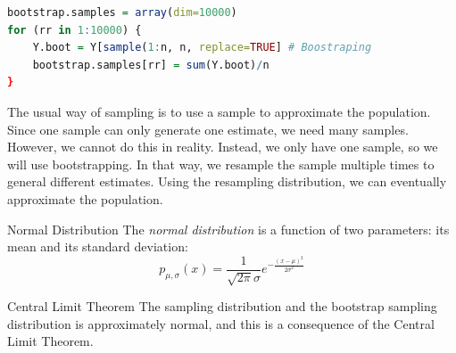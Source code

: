 \begin{lstlisting}[title=Boostraping Sample, language=r]
bootstrap.samples = array(dim=10000)
for (rr in 1:10000) {
	Y.boot = Y[sample(1:n, n, replace=TRUE] # Boostraping
	bootstrap.samples[rr] = sum(Y.boot)/n
}
\end{lstlisting}


\begin{rmk}
	The usual way of sampling is to use a sample to approximate the population. Since one sample can only generate one estimate, we need many samples. However, we cannot do this in reality. Instead, we only have one sample, so we will use bootstrapping. In that way, we resample the sample multiple times to general different estimates. Using the resampling distribution, we can eventually approximate the population. 
\end{rmk}
\begin{df}{Normal Distribution}
	The \textit{normal distribution} is a function of two parameters: its mean and its standard deviation: \[p_{\mu,\sigma}(x)=\dfrac{1}{\sqrt{2\pi}\sigma}e^{-\frac{(x-\mu)^2}{2\sigma^2}}\]
\end{df}
\begin{thm}{Central Limit Theorem}
	The sampling distribution and the bootstrap sampling distribution is approximately normal, and this is a consequence of the Central Limit Theorem. 
\end{thm}

